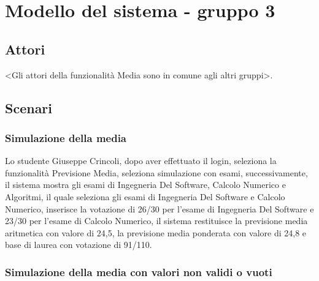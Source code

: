 
\chapter{Modello del sistema - gruppo 3}
\label{ref:modSistemaGruppo3}


\section{Attori}
<Gli attori della funzionalità Media sono in comune agli altri gruppi>.

\section{Scenari}

\subsection{Simulazione della media}

Lo studente Giuseppe Crincoli, dopo aver effettuato il login, seleziona la funzionalità Previsione Media, seleziona simulazione con esami, successivamente, il sistema mostra gli esami di Ingegneria Del Software, Calcolo Numerico e Algoritmi, il quale seleziona gli esami di Ingegneria Del Software e Calcolo Numerico, inserisce la votazione di 26/30 per l'esame di Ingegneria Del Software e 23/30 per l'esame di Calcolo Numerico, il sistema restituisce la previsione media aritmetica con valore di 24,5, la previsione media ponderata con valore di 24,8 e base di laurea con votazione di 91/110.

\subsection{Simulazione della media con valori non validi o vuoti}


